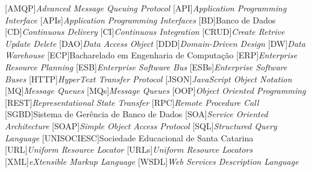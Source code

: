 
[AMQP]{\emph{Advanced Message Queuing Protocol}}
[API]{\emph{Application Programming Interface}}
[APIs]{\emph{Application Programming Interfaces}}
[BD]{Banco de Dados}
[CD]{\emph{Continuous Delivery}}
[CI]{\emph{Continuous Integration}}
[CRUD]{\emph{Create Retrive Update Delete}}
[DAO]{\emph{Data Access Object}}
[DDD]{\emph{Domain-Driven Design}}
[DW]{\emph{Data Warehouse}}
[ECP]{Bacharelado em Engenharia de Computação}
[ERP]{\emph{Enterprise Resource Planning}}
[ESB]{\emph{Enterprise Software Bus}}
[ESBs]{\emph{Enterprise Software Buses}}
[HTTP]{\emph{HyperText Transfer Protocol}}
[JSON]{\emph{JavaScript Object Notation}}
[MQ]{\emph{Message Queues}}
[MQs]{\emph{Message Queues}}
[OOP]{\emph{Object Oriented Programming}}
[REST]{\emph{Representational State Transfer}}
[RPC]{\emph{Remote Procedure Call}}
[SGBD]{Sistema de Gerência de Banco de Dados}
[SOA]{\emph{Service Oriented Architecture}}
[SOAP]{\emph{Simple Object Access Protocol}}
[SQL]{\emph{Structured Query Language}}
[UNISOCIESC]{Sociedade Educacional de Santa Catarina}
[URL]{\emph{Uniform Resource Locator}}
[URLs]{\emph{Uniform Resource Locators}}
[XML]{\emph{eXtensible Markup Language}}
[WSDL]{\emph{Web Services Description Language}}
